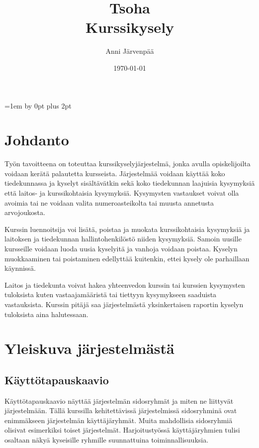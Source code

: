 \documentclass[12pt,a4paper,titlepage]{article}
\title{Tsoha\\ Kurssikysely \vspace{0.5em}}
\author{Anni Järvenpää}
\date{\today}
\begin{document}
\maketitle

\newpage
\tableofcontents
\thispagestyle{empty}
\newpage
\setcounter{page}{1}
\parskip=1em \advance\parskip by 0pt plus 2pt
\pagestyle{fancy}
\cfoot{\thepage}

\section{Johdanto}
Työn tavoitteena on toteuttaa kurssikyselyjärjestelmä, jonka avulla opiskelijoilta voidaan kerätä palautetta kursseista. Järjestelmää voidaan käyttää koko tiedekunnassa ja kyselyt sisältävätkin sekä koko tiedekunnan laajuisia kysymyksiä että laitos- ja kurssikohtaisia kysymyksiä. Kysymysten vastaukset voivat olla avoimia tai ne voidaan valita numeroasteikolta tai muusta annetusta arvojoukosta.

Kurssin luennoitsija voi lisätä, poistaa ja muokata kurssikohtaisia kysymyksiä ja laitoksen ja tiedekunnan hallintohenkilöstö niiden kysymyksiä. Samoin uusille kursseille voidaan luoda uusia kyselyitä ja vanhoja voidaan poistaa. Kyselyn muokkaaminen tai poistaminen edellyttää kuitenkin, ettei kysely ole parhaillaan käynnissä.

Laitos ja tiedekunta voivat hakea yhteenvedon kurssin tai kurssien kysymysten tuloksista kuten vastaajamääristä tai tiettyyn kysymykseen saaduista vastauksista. Kurssin pitäjä saa järjestelmästä yksinkertaisen raportin kyselyn tuloksista aina halutessaan.



\section{Yleiskuva järjestelmästä}
\subsection{Käyttötapauskaavio}
Käyttötapauskaavio näyttää järjestelmän sidosryhmät ja miten ne liittyvät järjestelmään. Tällä kurssilla kehitettävissä järjestelmissä sidosryhminä ovat enimmäkseen järjestelmän käyttäjäryhmät. Muita mahdollisia sidosryhmiä olisivat esimerkiksi toiset järjestelmät. Harjoitustyössä käyttäjäryhmien tulisi osaltaan näkyä kyseisille ryhmille suunnattuina toiminnallisuuksia.
\end{document}
